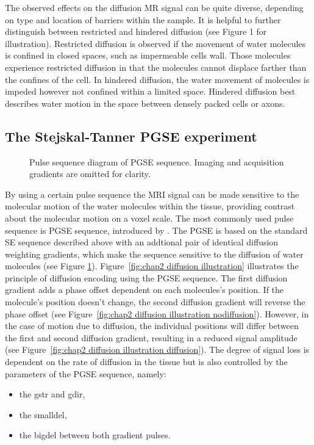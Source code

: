 The observed effects on the diffusion MR signal can be quite diverse, depending on type and location of barriers within the sample. It is helpful to further distinguish between restricted and hindered diffusion (see Figure 1 for illustration). Restricted diffusion is observed if the movement of water molecules is confined in closed spaces, such as impermeable cells wall. Those molecules experience restricted diffusion in that the molecules cannot displace farther than the confines of the cell. In hindered diffusion, the water movement of molecules is impeded however not confined within a limited space. Hindered diffusion best describes water motion in the space between densely packed cells or axons. 

\subsection*{The Stejskal-Tanner PGSE experiment}
\begin{figure}[ht]
\centering
{}
\caption{Pulse sequence diagram of PGSE sequence. Imaging and acquisition gradients are omitted for clarity.}
\label{fig:chapter2 pgse_diagram}
\end{figure}

By using a certain pulse sequence the MRI signal can be made sensitive to the molecular motion of the water molecules within the tissue, providing contrast about the molecular motion on a voxel scale. The most commonly used pulse sequence is {\gls{PGSE}} sequence, introduced by \citep{Stejskal:1966}. The {\gls{PGSE}} is based on the standard SE sequence described above with an addtional pair of identical diffusion weighting gradients, which make the sequence sensitive to the diffusion of water molecules (see Figure \ref{fig:chapter2 pgse_diagram}). Figure~\ref{fig:chap2 diffusion illustration} illustrates the principle of diffusion encoding using the PGSE sequence. The first diffusion gradient adds a phase offset dependent on each molecules's position. If the molecule's position doesn't change, the second diffusion gradient will reverse the phase offset (see Figure~\ref{fig:chap2 diffusion illustration nodiffusion}). However, in the case of motion due to diffusion, the individual positions will differ between the first and second diffusion gradient, resulting in a reduced signal amplitude	(see Figure~\ref{fig:chap2 diffusion illustration diffusion}). The degree of signal loss is dependent on the rate of diffusion in the tissue but is also controlled by the parameters of the {\gls{PGSE}} sequence, namely:
\begin{itemize}
	\item the {\gls{gstr}} and {\gls{gdir}},
	\item the {\gls{smalldel}},
	\item the {\gls{bigdel}} between both gradient pulses.
\end{itemize}

